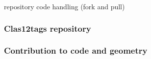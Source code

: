 repository code handling (fork and pull)


\subsubsection{Clas12tags repository}


\subsubsection{Contribution to code and geometry}



